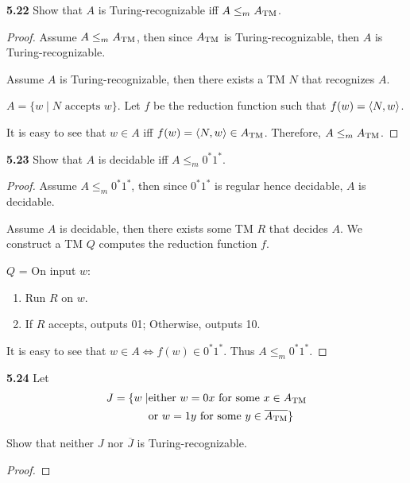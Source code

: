 \textbf{5.22} Show that $A$ is Turing-recognizable iff $A \leq_m A_{\text{TM}}$.
\begin{mdframed}
\begin{proof}
Assume $A \leq_m A_{\text{TM}}$, then since $A_{\text{TM}}$ is Turing-recognizable, then $A$ is Turing-recognizable.

Assume $A$ is Turing-recognizable, then there exists a TM $N$ that recognizes $A$.

$A = \{w \mid \text{$N$ accepts $w$} \}$. Let $f$ be the reduction function such that $f(w) = \langle{N, w}\rangle$. 

It is easy to see that $w \in A$ iff $f(w) = \langle{N, w}\rangle \in A_{\text{TM}}$. Therefore, $A \leq_m A_{\text{TM}}$.
\end{proof}
\end{mdframed}

\textbf{5.23} Show that $A$ is decidable iff $A \leq_m 0^*1^*$.
\begin{mdframed}
\begin{proof}
Assume $A \leq_m 0^*1^*$, then since $0^*1^*$ is regular hence decidable, $A$ is decidable.

Assume $A$ is decidable, then there exists some TM $R$ that decides $A$. We construct a TM $Q$ computes the reduction function $f$.

\medskip
$Q$  = On input $w$:
\begin{enumerate}
\item Run $R$ on $w$.
\item If $R$ accepts, outputs 01; Otherwise, outputs 10.
\end{enumerate}

It is easy to see that $w \in A \Leftrightarrow f(w) \in 0^* 1^*$. Thus $A \leq_m 0^*1^*$.
\end{proof}
\end{mdframed}

\textbf{5.24} Let 
\begin{align*}
J = \{ w \mid & \text{either $w = 0x$ for some $x \in A_{\text{TM}}$} \\ 
& \text{or $w=1y$ for some $y\in\overline{A_{\text{TM}}}$} \}
\end{align*}

Show that neither $J$ nor $\overline{J}$ is Turing-recognizable.

\begin{mdframed}
\begin{proof}

\end{proof}
\end{mdframed}

